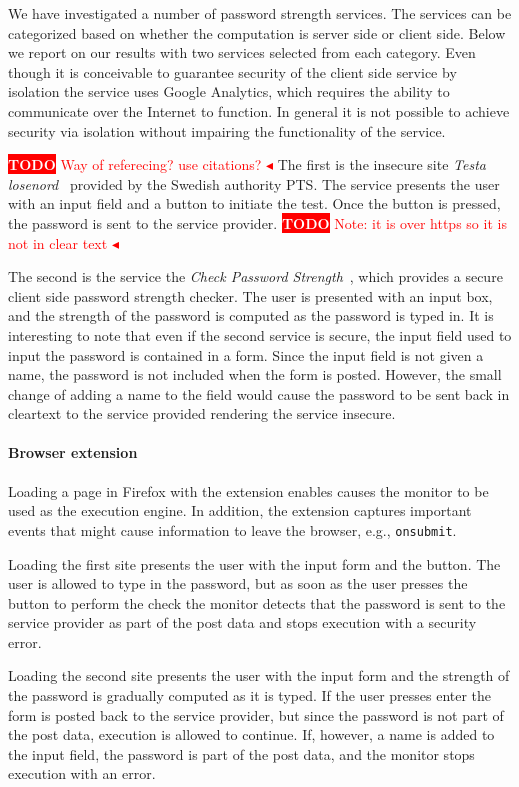 \documentclass{llncs}
\newcommand{\todo}[1]{\colorbox{red}{\textcolor{white}{\sffamily\bfseries\scriptsize TODO}} \textcolor{red}{#1} \textcolor{red}{$\blacktriangleleft$}}
\begin{document}
We have investigated a number of password strength services. The services can
be categorized based on whether the computation is server side or client side.
Below we report on our results with two services selected from each category. 
Even though it is conceivable to guarantee security of the client side service
by isolation the service uses Google Analytics, which requires the ability
to communicate over the Internet to function. In general it is not possible
to achieve security via isolation without impairing the functionality of
the service.

\todo{Way of referecing? use citations?}
The first is the insecure site \emph{Testa losenord}~\cite{pts} provided by
the Swedish authority PTS. The service presents the user with an input field
and a button to initiate the test. Once the button is pressed, the
password is sent to the service provider.
\todo{Note: it is over https so it is not in clear text}

The second is the service the \emph{Check Password Strength}~\cite{GSP}, which provides a
secure client side password strength checker. The user is presented with an
input box, and the strength of the password is computed as the password
is typed in.
%
It is interesting to note that even if the second service is secure, the input
field used to input the password is contained in a form. Since the input field
is not given a name, the password is not included when the form is posted.
However, the small change of adding a name to the field would cause the
password to be sent back in cleartext to the service provided rendering the
service insecure.

\paragraph{Browser extension}
%
Loading a page in Firefox with the extension enables causes the monitor to be used
as the execution engine. In addition, the extension captures important events that
might cause information to leave the browser, e.g., \lstinline{onsubmit}. 

Loading the first site presents the user with the input form and the button. The user
is allowed to type in the password, but as soon as the user presses the button to perform
the check the monitor detects that the password is sent to the service provider
as part of the post data and stops execution with a security error.

Loading the second site presents the user with the input form and the strength of the password 
is gradually computed as it is typed. If the user presses enter the form is posted back to
the service provider, but since the password is not part of the post data, execution is
allowed to continue. If, however, a name is added to the input field, the password is part
of the post data, and the monitor stops execution with an error.
\end{document}
